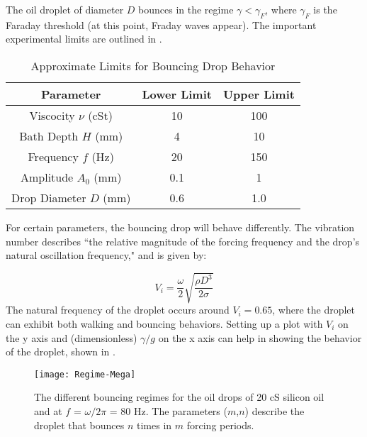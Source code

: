 	       The oil droplet of diameter $D$ bounces in the regime $\gamma<\gamma_F$, where $\gamma_F$ is the Faraday threshold (at this point, Fraday waves appear). The important experimental limits are outlined in . 
	       \begin{table}[htdp] 
\caption[Basic Table 1]{Approximate Limits for Bouncing Drop Behavior} 
\begin{center} 
\begin{tabular}{c c c} 
\toprule 
  Parameter &  Lower Limit & Upper Limit \\
  \midrule
Viscocity $\nu$ (cSt) & 10 & 100 \\ 
Bath Depth $H$ (mm) & 4 & 10 \\
Frequency $f$ (Hz) & 20 & 150 \\
Amplitude $A_0$ (mm) & 0.1 & 1 \\
Drop Diameter $D$ (mm) & 0.6 & 1.0 \\
\bottomrule 
\end{tabular}
\end{center}
\label{approxlimits} 
\end{table}	

For certain parameters, the bouncing drop will behave differently. The vibration number describes ``the relative magnitude of the forcing frequency and the drop's natural oscillation frequency," and is given by:
	       	      
\begin{equation} \label{vibrationnumber}
V_i = \frac{\omega}{2}\sqrt{\frac{\rho D^3}{2\sigma}}
\end{equation}   	       	       
	       	       The natural frequency of the droplet occurs around $V_i = 0.65$, where the droplet can exhibit both walking and bouncing behaviors. Setting up a plot with $V_i$ on the y axis and (dimensionless) ${\gamma}/{g}$ on the x axis can help in showing the behavior of the droplet, shown in . 
	    
	    \begin{figure}[h]
	   
	       \centering
	    \texttt{[image: Regime-Mega]}
	     \caption{The different bouncing regimes for the oil drops of 20 cS silicon oil and at $f$ = $\omega / 2\pi$ = 80 Hz. The parameters ($m$,$n$) describe the droplet that bounces $n$ times in $m$ forcing periods. }
	 \label{regime}
	\end{figure}

